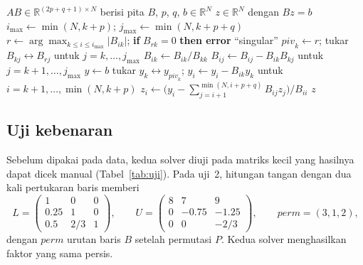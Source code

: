 \documentclass[12pt,a4paper]{article}
\newcommand{\R}{\mathbb{R}}
\numberwithin{equation}{section}
\begin{document}
\begin{algorithm}[H]
\caption{Faktorisasi dan penyelesaian banded dengan \emph{partial pivoting}. Notasi $B_{ij}$ berarti elemen yang
disimpan di $AB_{p+q+1+i-j,\,j}$.}
\label{alg:band}
\begin{algorithmic}[1]
\Require $AB\in\R^{(2p+q+1)\times N}$ berisi pita $B$, $p$, $q$, $b\in\R^N$
\Ensure $z\in\R^N$ dengan $Bz=b$
  \State $i_{\max}\gets\min(N,k+p)$; \quad $j_{\max}\gets\min(N,k+p+q)$
  \State $r\gets\arg\max_{k\le i\le i_{\max}}\lvert B_{ik}\rvert$; \textbf{if} $B_{rk}=0$ \textbf{then error}
  ``singular''
  \State $\mathit{piv}_k\gets r$; tukar $B_{kj}\leftrightarrow B_{rj}$ untuk $j=k,\dots,j_{\max}$
    \State $B_{ik}\gets B_{ik}/B_{kk}$ 
    \State $B_{ij}\gets B_{ij}-B_{ik}B_{kj}$ untuk $j=k+1,\dots,j_{\max}$
  \EndFor
\EndFor
\State $y\gets b$
 
  \State tukar $y_k\leftrightarrow y_{\mathit{piv}_k}$; \quad
         $y_i\gets y_i-B_{ik}y_k$ untuk $i=k+1,\dots,\min(N,k+p)$
\EndFor
{} 
  \State $z_i\gets\bigl(y_i-\sum_{j=i+1}^{\min(N,i+p+q)}B_{ij}z_j\bigr)/B_{ii}$
\EndFor
\State \Return $z$
\end{algorithmic}
\end{algorithm}

\subsection{Uji kebenaran}
Sebelum dipakai pada data, kedua solver diuji pada matriks kecil yang hasilnya dapat dicek manual
(Tabel~\ref{tab:uji}). Pada uji~2, hitungan tangan dengan dua kali pertukaran baris memberi
\[
L=\begin{pmatrix}1&0&0\\0.25&1&0\\0.5&2/3&1\end{pmatrix},\qquad
U=\begin{pmatrix}8&7&9\\0&-0.75&-1.25\\0&0&-2/3\end{pmatrix},\qquad
\mathit{perm}=(3,1,2),
\]
dengan $\mathit{perm}$ urutan baris $B$ setelah permutasi $P$. Kedua solver menghasilkan faktor yang sama persis.
\end{document}
